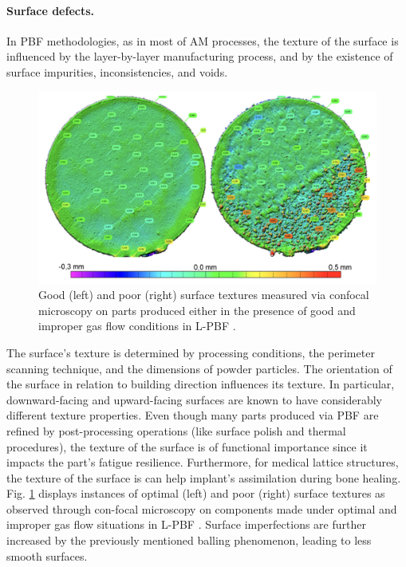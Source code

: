 \paragraph{Surface defects.} In PBF methodologies, as in most of AM processes, the texture of the surface is influenced by the layer-by-layer manufacturing process, and by the existence of surface impurities, inconsistencies, and voids.
\begin{figure}
    \centering
    \includegraphics[scale=0.4]{Images/surface.png}
    \caption[Surface roughness in PBF]{Good (left) and poor (right) surface textures measured via confocal microscopy on parts produced either in the presence of good and improper gas flow conditions in L-PBF \cite{ladewig_influence_2016}.}
    \label{fig:surface}
\end{figure}
The surface's texture is determined by processing conditions, the perimeter scanning technique, and the dimensions of powder particles. The orientation of the surface in relation to building direction influences its texture. In particular, downward-facing and upward-facing surfaces are known to have considerably different texture properties. Even though many parts produced via PBF are refined by post-processing operations (like surface polish and thermal procedures), the texture of the surface is of functional importance since it impacts the part's fatigue resilience. Furthermore, for medical lattice structures, the texture of the surface is can help implant's assimilation during bone healing. Fig. \ref{fig:surface} displays instances of optimal (left) and poor (right) surface textures as observed through con-focal microscopy on components made under optimal and improper gas flow situations in L-PBF \cite{ladewig_influence_2016}. Surface imperfections are further increased by the previously mentioned balling phenomenon, leading to less smooth surfaces.
